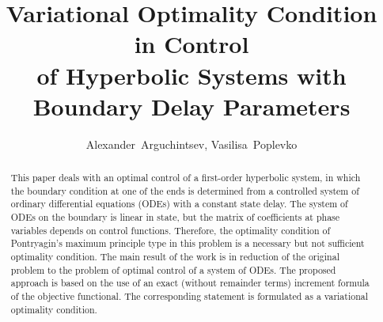 \documentclass[12pt]{llncs}
\begin{document}
%
\fi
\title{Variational Optimality Condition in Control \\ of Hyperbolic Systems with \\ Boundary Delay Parameters}
%
%
\author{Alexander~Arguchintsev, Vasilisa~Poplevko}
%
%
%

\maketitle              %

\begin{abstract}
This paper deals with an optimal control of a first-order hyperbolic system, in which the boundary condition at one of the ends is determined from a controlled system of ordinary differential equations (ODEs) with a constant state delay. The system of ODEs on the boundary is linear in state, but the matrix of coefficients at phase variables depends on control functions. Therefore, the optimality condition of Pontryagin's maximum principle type in this problem is a necessary but not sufficient optimality condition. The main result of the work is in reduction of the original problem to the problem of optimal control of a system of ODEs. The proposed approach is based on the use of an exact (without remainder terms) increment formula of the objective functional. The corresponding statement is formulated as a variational optimality condition.
\end{abstract}
%
\end{document}
